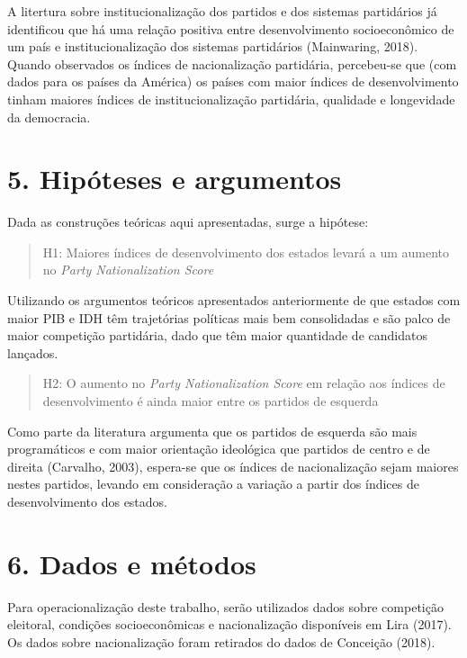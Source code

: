 \documentclass[]{article}
\begin{document}
A litertura sobre institucionalização dos partidos e dos sistemas
partidários já identificou que há uma relação positiva entre
desenvolvimento socioeconômico de um país e institucionalização dos
sistemas partidários (Mainwaring, 2018). Quando observados os índices de
nacionalização partidária, percebeu-se que (com dados para os países da
América) os países com maior índices de desenvolvimento tinham maiores
índices de institucionalização partidária, qualidade e longevidade da
democracia.

\section{5. Hipóteses e argumentos}\label{hipoteses-e-argumentos}

Dada as construções teóricas aqui apresentadas, surge a hipótese:

\begin{quote}
H1: Maiores índices de desenvolvimento dos estados levará a um aumento
no \emph{Party Nationalization Score}
\end{quote}

Utilizando os argumentos teóricos apresentados anteriormente de que
estados com maior PIB e IDH têm trajetórias políticas mais bem
consolidadas e são palco de maior competição partidária, dado que têm
maior quantidade de candidatos lançados.

\begin{quote}
H2: O aumento no \emph{Party Nationalization Score} em relação aos
índices de desenvolvimento é ainda maior entre os partidos de esquerda
\end{quote}

Como parte da literatura argumenta que os partidos de esquerda são mais
programáticos e com maior orientação ideológica que partidos de centro e
de direita (Carvalho, 2003), espera-se que os índices de nacionalização
sejam maiores nestes partidos, levando em consideração a variação a
partir dos índices de desenvolvimento dos estados.

\section{6. Dados e métodos}\label{dados-e-metodos}

Para operacionalização deste trabalho, serão utilizados dados sobre
competição eleitoral, condições socioeconômicas e nacionalização
disponíveis em Lira (2017). Os dados sobre nacionalização foram
retirados do dados de Conceição (2018).
\end{document}
